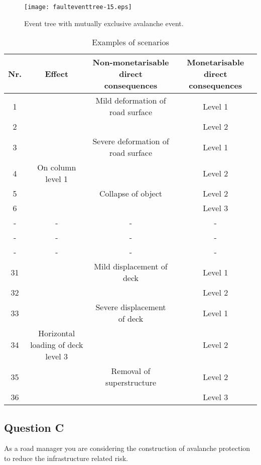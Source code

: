 \begin{figure}[h]
\begin{center}
\texttt{[image: faulteventtree-15.eps]}
\caption{Event tree with mutually exclusive avalanche event.}
\label{figeventfault:4}
\end{center}
\end{figure}

\begin{table}
	\centering
	\caption{Examples of scenarios} \label{tbleventfault:1}
\begin{tabular}{|c|c|c|c|}
\hline
Nr. & Effect & Non-monetarisable direct consequences & Monetarisable direct consequences \\ 
\hline
1 &  & Mild deformation of road surface & Level 1 \\ 
\cline{1-1}\cline{4-4}
2 &  &  & Level 2 \\ 
\cline{1-1}\cline{3-4}
3 &  & Severe deformation of road surface & Level 1 \\ 
\cline{1-1}\cline{4-4}
4 & On column level 1 &  & Level 2 \\ 
\cline{1-1}\cline{3-4}
5 &  & Collapse of object & Level 2 \\ 
\cline{1-1}\cline{4-4}
6 &  &  & Level 3 \\ 
\hline
- & - & - & - \\ 
- & - & - & - \\ 
- & - & - & - \\ 
\hline
31 &  & Mild displacement of deck & Level 1 \\ 
\cline{1-1}\cline{4-4}
32 &  &  & Level 2 \\ 
\cline{1-1}\cline{3-4}
33 &  & Severe displacement of deck & Level 1 \\ 
\cline{1-1}\cline{4-4}
34 & Horizontal loading of deck level 3 &  & Level 2 \\ 
\cline{1-1}\cline{3-4}
35 &  & Removal of superstructure & Level 2 \\ 
\cline{1-1}\cline{4-4}
36 &  &  & Level 3 \\ 
\hline
\end{tabular}
\end{table}
\subsection{Question C}
As a road manager you are considering the construction of avalanche protection
to reduce the infrastructure related risk.

